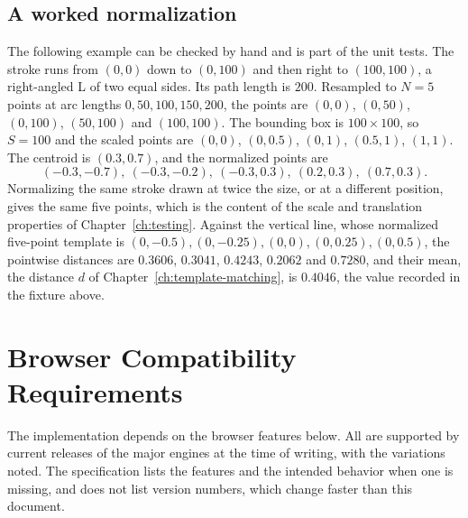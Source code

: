 \section{A worked normalization}

The following example can be checked by hand and is part of the unit tests. The stroke runs from $(0,0)$ down to $(0,100)$ and then right to $(100,100)$, a right-angled L of two equal sides. Its path length is $200$. Resampled to $N=5$ points at arc lengths $0,50,100,150,200$, the points are $(0,0)$, $(0,50)$, $(0,100)$, $(50,100)$ and $(100,100)$. The bounding box is $100\times100$, so $S=100$ and the scaled points are $(0,0)$, $(0,0.5)$, $(0,1)$, $(0.5,1)$, $(1,1)$. The centroid is $(0.3,0.7)$, and the normalized points are
\[
(-0.3,-0.7),\ (-0.3,-0.2),\ (-0.3,0.3),\ (0.2,0.3),\ (0.7,0.3).
\]
Normalizing the same stroke drawn at twice the size, or at a different position, gives the same five points, which is the content of the scale and translation properties of Chapter~\ref{ch:testing}. Against the vertical line, whose normalized five-point template is $(0,-0.5),(0,-0.25),(0,0),(0,0.25),(0,0.5)$, the pointwise distances are $0.3606$, $0.3041$, $0.4243$, $0.2062$ and $0.7280$, and their mean, the distance $d$ of Chapter~\ref{ch:template-matching}, is $0.4046$, the value recorded in the fixture above.

\chapter{Browser Compatibility Requirements}\label{app:compat}

The implementation depends on the browser features below. All are supported by current releases of the major engines at the time of writing, with the variations noted. The specification lists the features and the intended behavior when one is missing, and does not list version numbers, which change faster than this document.

